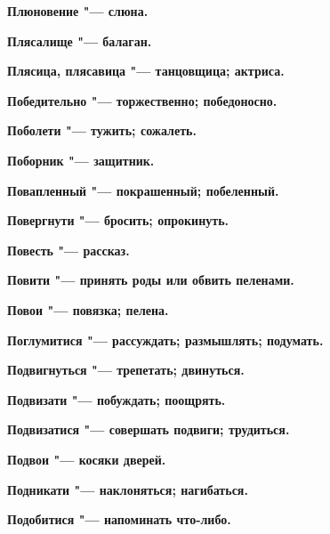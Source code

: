 \bfseries Плюновение \normalfont{} "--- слюна. 




\bfseries Плясалище \normalfont{} "--- балаган. 




\bfseries Плясица, плясавица \normalfont{} "--- танцовщица; актриса. 




\bfseries Победительно \normalfont{} "--- торжественно; победоносно. 




\bfseries Поболети \normalfont{} "--- тужить; сожалеть. 




\bfseries Поборник \normalfont{} "--- защитник. 




\bfseries Повапленный \normalfont{} "--- покрашенный; побеленный. 




\bfseries Повергнути \normalfont{} "--- бросить; опрокинуть. 




\bfseries Повесть \normalfont{} "--- рассказ. 




\bfseries Повити \normalfont{} "--- принять роды или обвить пеленами. 




\bfseries Повои \normalfont{} "--- повязка; пелена. 




\bfseries Поглумитися \normalfont{} "--- рассуждать; размышлять; подумать. 




\bfseries Подвигнуться \normalfont{} "--- трепетать; двинуться. 




\bfseries Подвизати \normalfont{} "--- побуждать; поощрять. 




\bfseries Подвизатися \normalfont{} "--- совершать подвиги; трудиться. 




\bfseries Подвои \normalfont{} "--- косяки дверей. 




\bfseries Подникати \normalfont{} "--- наклоняться; нагибаться. 




\bfseries Подобитися \normalfont{} "--- напоминать что-либо. 




